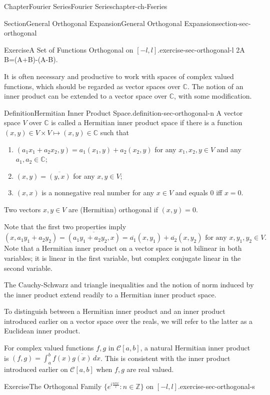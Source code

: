 \documentclass[oneside,10pt,]{book}
\numberwithin{equation}{section}
\newcommand{\bbC}{\mathbb{C}}
\newcommand{\bbZ}{\mathbb{Z}}
\newcommand{\cC}{\mathcal{C}}
\begin{document}
\begin{chapterptx}{Chapter}{Fourier Series}{}{Fourier Series}{}{}{chapter-ch-Fseries}
\begin{sectionptx}{Section}{General Orthogonal Expansion}{}{General Orthogonal Expansion}{}{}{section-sec-orthogonal}
\begin{inlineexercise}{Exercise}{A Set of Functions Orthogonal on \([-l, l]\).}{exercise-sec-orthogonal-l}
2\sin A \cos B=\sin(A+B)-\sin(A-B)\).\end{inlineexercise}%
It is often necessary and productive to work with spaces of complex valued functions, which should be regarded as vector spaces over \(\bbC\). The notion of an inner product can be extended to a vector space over \(\bbC\), with some modification.%
\begin{definition}{Definition}{Hermitian Inner Product Space.}{definition-sec-orthogonal-n}%
A vector space \(V\) over  \(\bbC\) is called a Hermitian inner product space if there is a function \((x, y)\in V\times V\mapsto (x, y)\in \bbC\) such that%
\begin{enumerate}
\item{}\((a_{1}x_{1}+a_{2}x_{2},y)=a_{1}(x_{1},y)+a_{2}(x_{2}, y)\) for any \(x_{1}, x_{2}, y\in V\) and any \(a_{1}, a_{2}\in \bbC\);%
\item{}\((x, y)=\overline{(y, x)}\) for any \(x, y\in V\);%
\item{}\((x, x) \) is a nonnegative real number for any \(x\in V\) and equals \(0\) iff \(x=0\).%
\end{enumerate}
%
\par
Two vectors \(x, y\in V\) are (Hermitian) orthogonal if \((x, y)=0\).%
\end{definition}
Note that the first two properties imply%
\begin{equation*}
(x, a_{1}y_{1}+a_{2}y_{2})=\overline{(a_{1}y_{1}+a_{2}y_{2}, x)}= \overline{a_{1}}(x, y_{1})+\overline{a_{2}}(x, y_{2}) \text{ for  any $x, y_{1}, y_{2}\in V$.}
\end{equation*}
Note that  a Hermitian inner product on a vector space  is not bilinear in both variables; it is linear in the first  variable, but complex conjugate linear in the second variable.%
\par
The Cauchy-Schwarz and triangle inequalities and the notion of norm induced by the inner product extend readily to a Hermitian inner product space.%
\par
To distinguish between a Hermitian inner product and an inner product introduced earlier on a vector space over the reals, we will refer to the latter as a Euclidean inner product.%
\par
For complex valued functions \(f,  g\) in \(\cC[a, b]\), a natural Hermitian inner product is \((f, g)=\int_{a}^{b} f(x)\overline{g(x)}\,dx\). This is consistent with the inner product introduced earlier  on \(\cC[a, b]\) when \(f,  g\) are real valued.%
\begin{inlineexercise}{Exercise}{The Orthogonal Family \(\{ e^{i\frac{n\pi x}{l}}: n\in \bbZ\}\) on \([-l, l]\).}{exercise-sec-orthogonal-s}%

\end{inlineexercise}
\end{sectionptx}
\end{chapterptx}
\end{document}
